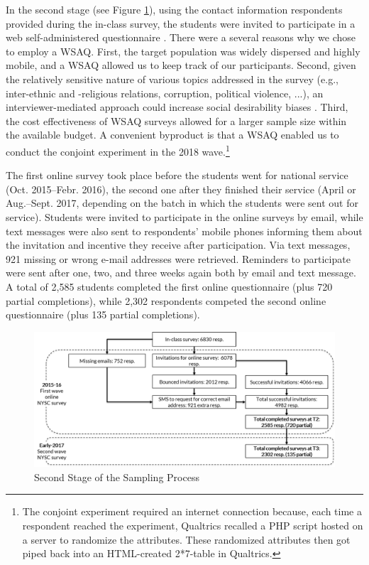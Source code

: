 In the second stage (see Figure \ref{fig:art2-app-fig2}), using the contact information respondents provided during the in-class survey, the students were invited to participate in a web self-administered questionnaire  \citep[WSAQ;][]{Callegaro2015}. There were a several reasons why we chose to employ a WSAQ. First, the target population was widely dispersed and highly mobile, and a WSAQ allowed us to keep track of our participants. Second, given the relatively sensitive nature of various topics addressed in the survey (e.g., inter-ethnic and -religious relations, corruption, political violence, ...), an interviewer-mediated approach could increase social desirability biases \citep{DuToit2016}. Third, the cost effectiveness of WSAQ surveys allowed for a larger sample size within the available budget. A convenient byproduct is that a WSAQ enabled us to conduct the conjoint experiment in the 2018 wave.\footnote{The conjoint experiment required an internet connection because, each time a respondent reached the experiment, Qualtrics recalled a PHP script hosted on a server to randomize the attributes. These randomized attributes then got piped back into an HTML-created 2*7-table in Qualtrics.} 


The first online survey took place before the students went for national service (Oct. 2015--Febr. 2016), the second one after they finished their service (April or Aug.--Sept. 2017, depending on the batch in which the students were sent out for service). Students were invited to participate in the online surveys by email, while text messages were also sent to respondents’ mobile phones informing them about the invitation and incentive they receive after participation. Via text messages, 921 missing or wrong e-mail addresses were retrieved. Reminders to participate were sent after one, two, and three weeks again both by email and text message. A total of 2,585 students completed the first online questionnaire (plus 720 partial completions), while 2,302 respondents competed the second online questionnaire (plus 135 partial completions).

\vspace{3mm}
\begin{figure}[H]
\includegraphics[width=1\textwidth]{Appendices/Appendix_chapter_3/art2-app-figure2.png}
\caption{Second Stage of the Sampling Process}
\label{fig:art2-app-fig2}
\end{figure}

